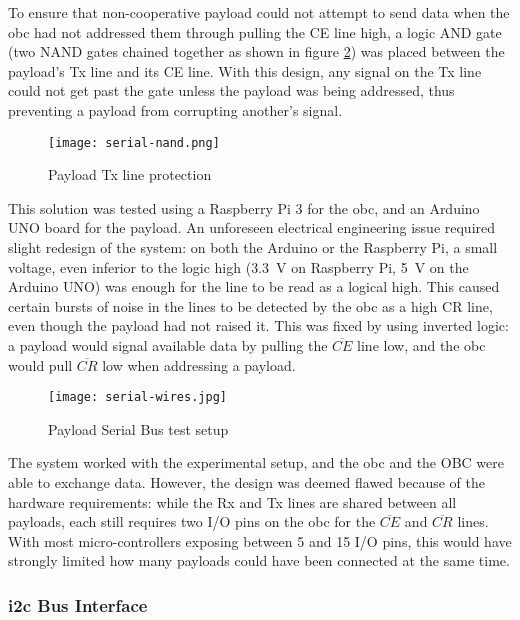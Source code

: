 To ensure that non-cooperative payload could not attempt to send data when the
\acrshort{obc} had not addressed them through pulling the CE line high, a logic
AND gate (two NAND gates chained together as shown in figure \ref{fig:uart-nor})
was placed between the payload's Tx line and its CE line. With this design,
any signal on the Tx line could not get past the gate unless the payload was
being addressed, thus preventing a payload from corrupting another's signal.

\begin{figure}[H]
\texttt{[image: serial-nand.png]}
\centering
\caption{Payload Tx line protection}
\label{fig:uart-nor}
\end{figure}

This solution was tested using a Raspberry Pi 3 for the \acrlong{obc}, and an
Arduino UNO board for the payload. An unforeseen electrical engineering issue
required slight redesign of the system: on both the Arduino or the Raspberry
Pi, a small voltage, even inferior to the logic high (\SI{3.3}{V} on Raspberry
Pi, \SI{5}{V} on the Arduino UNO) was enough for the line to be read as a
logical high. This caused certain bursts of noise in the lines to be detected
by the \acrshort{obc} as a high CR line, even though the payload had not
raised it. This was fixed by using inverted logic: a payload would signal 
available data by pulling the \(\overline{CE}\) line low, and the \acrshort{obc}
would pull \(\overline{CR}\) low when addressing a payload.

\begin{figure}[H]
\texttt{[image: serial-wires.jpg]}
\centering
\caption{Payload Serial Bus test setup}
\label{fig:uart-nor}
\end{figure}

The system worked with the experimental setup, and the \acrlong{obc} and the
OBC were able to exchange data. However, the design was deemed flawed because
of the hardware requirements: while the Rx and Tx lines are shared between all
payloads, each still requires two I/O pins on the \acrshort{obc} for the 
\(\overline{CE}\) and \(\overline{CR}\) lines. With most micro-controllers
exposing between 5 and 15 I/O pins, this would have strongly limited how many
payloads could have been connected at the same time.

\subsubsection{\acrshort{i2c} Bus Interface}

